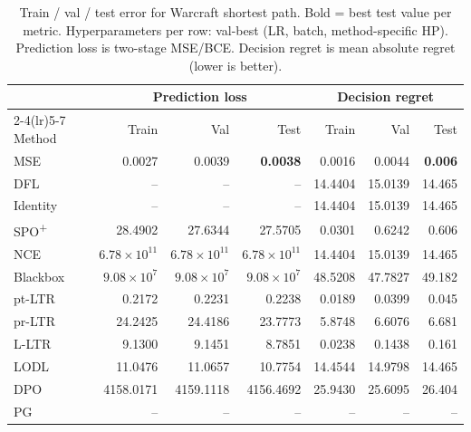 \begin{table}[h]
\centering
\caption[Train/val/test error for Warcraft shortest path.]{Train / val / test error for Warcraft shortest path. Bold = best test value per metric. Hyperparameters per row: val-best (LR, batch, method-specific HP). Prediction loss is two-stage MSE/BCE. Decision regret is mean absolute regret (lower is better).}
\label{tab:err-shortestpath}
\setlength{\tabcolsep}{4pt}
\renewcommand{\arraystretch}{1.05}
\begin{tabular}{@{}lrrrrrr@{}}
\toprule
& \multicolumn{3}{c}{Prediction loss} & \multicolumn{3}{c}{Decision regret} \\
\cmidrule(lr){2-4}\cmidrule(lr){5-7}
Method & Train & Val & Test & Train & Val & Test \\
\midrule
MSE & 0.0027 & 0.0039 & \textbf{0.0038} & 0.0016 & 0.0044 & \textbf{0.006} \\
DFL & -- & -- & -- & 14.4404 & 15.0139 & 14.465 \\
Identity & -- & -- & -- & 14.4404 & 15.0139 & 14.465 \\
SPO\textsuperscript{+} & 28.4902 & 27.6344 & 27.5705 & 0.0301 & 0.6242 & 0.606 \\
NCE & $6.78{\times}10^{11}$ & $6.78{\times}10^{11}$ & $6.78{\times}10^{11}$ & 14.4404 & 15.0139 & 14.465 \\
Blackbox & $9.08{\times}10^{7}$ & $9.08{\times}10^{7}$ & $9.08{\times}10^{7}$ & 48.5208 & 47.7827 & 49.182 \\
pt-LTR & 0.2172 & 0.2231 & 0.2238 & 0.0189 & 0.0399 & 0.045 \\
pr-LTR & 24.2425 & 24.4186 & 23.7773 & 5.8748 & 6.6076 & 6.681 \\
L-LTR & 9.1300 & 9.1451 & 8.7851 & 0.0238 & 0.1438 & 0.161 \\
LODL & 11.0476 & 11.0657 & 10.7754 & 14.4544 & 14.9798 & 14.465 \\
DPO & 4158.0171 & 4159.1118 & 4156.4692 & 25.9430 & 25.6095 & 26.404 \\
PG & -- & -- & -- & -- & -- & -- \\
\bottomrule
\end{tabular}
\end{table}
